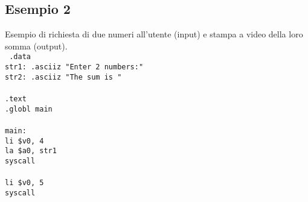 \documentclass[../main.tex]{subfiles}
\begin{document}
\subsection*{Esempio 2}
Esempio di richiesta di due numeri all'utente (input) e
stampa a video della loro somma (output). \\[3mm]
\texttt{
    .data \\
    \hspace*{0cm} \hspace*{0cm} \hspace*{0cm} \hspace*{0cm} str1: .asciiz "Enter 2 numbers:" \\
    \hspace*{0cm} \hspace*{0cm} \hspace*{0cm} \hspace*{0cm} str2: .asciiz "The sum is " \\
    \\
    .text \\
    .globl main \\
    \\
    main: \\
    \hspace*{0cm} \hspace*{0cm} \hspace*{0cm} \hspace*{0cm} li \$v0, 4 \\
    \hspace*{0cm} \hspace*{0cm} \hspace*{0cm} \hspace*{0cm} la \$a0, str1 \\
    \hspace*{0cm} \hspace*{0cm} \hspace*{0cm} \hspace*{0cm} syscall \\
    \\
    \hspace*{0cm} \hspace*{0cm} \hspace*{0cm} \hspace*{0cm} li \$v0, 5 \\
    \hspace*{0cm} \hspace*{0cm} \hspace*{0cm} \hspace*{0cm} syscall \\
}
\end{document}
